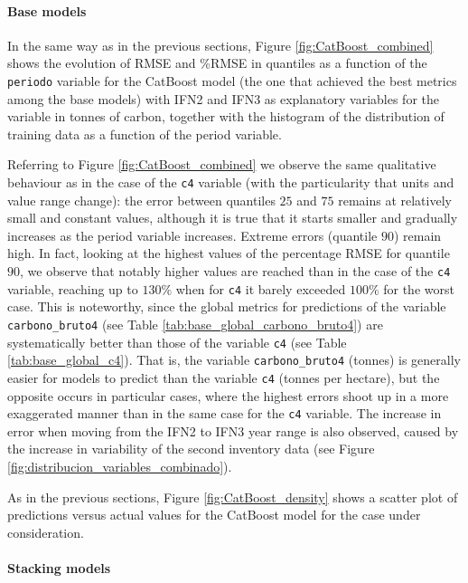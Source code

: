 \paragraph{Base models}

In the same way as in the previous sections, Figure \ref{fig:CatBoost_combined} shows the evolution of RMSE and \%RMSE in quantiles as a function of the \texttt{periodo} variable for the CatBoost model (the one that achieved the best metrics among the base models) with IFN2 and IFN3 as explanatory variables for the variable in tonnes of carbon, together with the histogram of the distribution of training data as a function of the period variable.


Referring to Figure \ref{fig:CatBoost_combined} we observe the same qualitative behaviour as in the case of the \texttt{c4} variable (with the particularity that units and value range change): the error between quantiles $25$ and $75$ remains at relatively small and constant values, although it is true that it starts smaller and gradually increases as the period variable increases. Extreme errors (quantile $90$) remain high. In fact, looking at the highest values of the percentage RMSE for quantile $90$, we observe that notably higher values are reached than in the case of the \texttt{c4} variable, reaching up to $130\%$ when for \texttt{c4} it barely exceeded $100\%$ for the worst case. This is noteworthy, since the global metrics for predictions of the variable \texttt{carbono\_bruto4} (see Table \ref{tab:base_global_carbono_bruto4}) are systematically better than those of the variable \texttt{c4} (see Table \ref{tab:base_global_c4}). That is, the variable \texttt{carbono\_bruto4} (tonnes) is generally easier for models to predict than the variable \texttt{c4} (tonnes per hectare), but the opposite occurs in particular cases, where the highest errors shoot up in a more exaggerated manner than in the same case for the \texttt{c4} variable. The increase in error when moving from the IFN2 to IFN3 year range is also observed, caused by the increase in variability of the second inventory data (see Figure \ref{fig:distribucion_variables_combinado}).

As in the previous sections, Figure \ref{fig:CatBoost_density} shows a scatter plot of predictions versus actual values for the CatBoost model for the case under consideration.




\paragraph{Stacking models}

